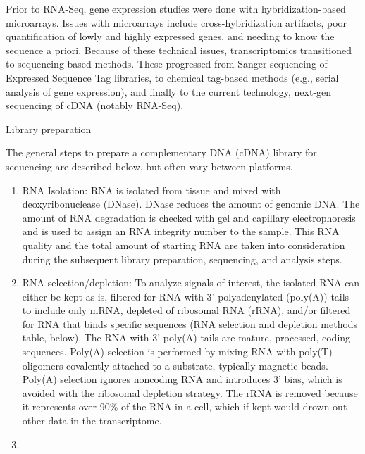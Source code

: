 Prior to RNA-Seq, gene expression studies were done with hybridization-based microarrays. Issues with microarrays include cross-hybridization artifacts, poor quantification of lowly and highly expressed genes, and needing to know the sequence a priori. Because of these technical issues, transcriptomics transitioned to sequencing-based methods. These progressed from Sanger sequencing of Expressed Sequence Tag libraries, to chemical tag-based methods (e.g., serial analysis of gene expression), and finally to the current technology, next-gen sequencing of cDNA (notably RNA-Seq).

Library preparation

The general steps to prepare a complementary DNA (cDNA) library for sequencing are described below, but often vary between platforms.

\begin{enumerate}
\def\labelenumi{\arabic{enumi}.}
\tightlist
\item
  RNA Isolation: RNA is isolated from tissue and mixed with deoxyribonuclease (DNase). DNase reduces the amount of genomic DNA. The amount of RNA degradation is checked with gel and capillary electrophoresis and is used to assign an RNA integrity number to the sample. This RNA quality and the total amount of starting RNA are taken into consideration during the subsequent library preparation, sequencing, and analysis steps.
\item
  RNA selection/depletion: To analyze signals of interest, the isolated RNA can either be kept as is, filtered for RNA with 3' polyadenylated (poly(A)) tails to include only mRNA, depleted of ribosomal RNA (rRNA), and/or filtered for RNA that binds specific sequences (RNA selection and depletion methods table, below). The RNA with 3' poly(A) tails are mature, processed, coding sequences. Poly(A) selection is performed by mixing RNA with poly(T) oligomers covalently attached to a substrate, typically magnetic beads. Poly(A) selection ignores noncoding RNA and introduces 3' bias, which is avoided with the ribosomal depletion strategy. The rRNA is removed because it represents over 90\% of the RNA in a cell, which if kept would drown out other data in the transcriptome.
\item

\end{enumerate}
